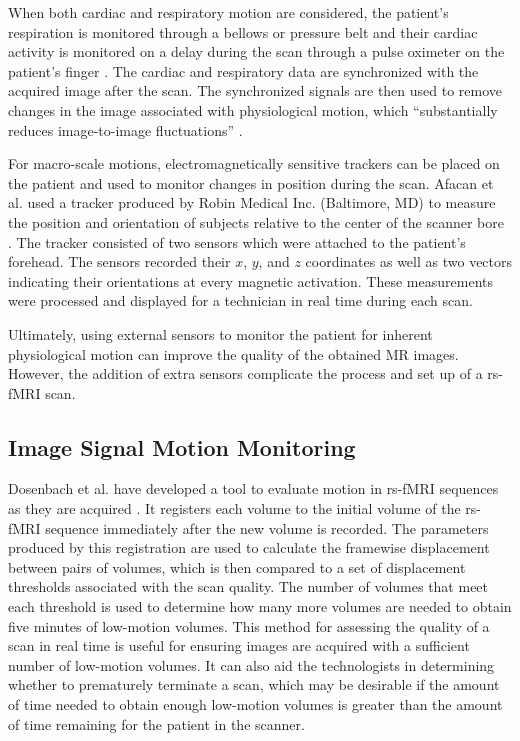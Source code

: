When both cardiac and respiratory motion are considered, the patient's respiration is monitored through a bellows or pressure belt and their cardiac activity is monitored on a delay during the scan through a pulse oximeter on the patient's finger \cite{Hu1995}. The cardiac and respiratory data are synchronized with the acquired image after the scan. The synchronized signals are then used to remove changes in the image associated with physiological motion, which ``substantially reduces image-to-image fluctuations'' \cite{Hu199}.


For macro-scale motions, electromagnetically sensitive trackers can be placed on the patient and used to monitor changes in position during the scan. Afacan et al. used a tracker produced by Robin Medical Inc. (Baltimore, MD) to measure the position and orientation of subjects relative to the center of the scanner bore \cite{Afacan2016}. The tracker consisted of two sensors which were attached to the patient's forehead. The sensors recorded their $x$, $y$, and $z$ coordinates as well as two vectors indicating their orientations at every magnetic activation. These measurements were processed and displayed for a technician in real time during each scan.


Ultimately, using external sensors to monitor the patient for inherent physiological motion can improve the quality of the obtained MR images. However, the addition of extra sensors complicate the process and set up of a rs-fMRI scan.

\subsection{Image Signal Motion Monitoring}



Dosenbach et al. have developed a tool to evaluate motion in rs-fMRI sequences as they are acquired \cite{Dosenbach2017}. It registers each volume to the initial volume of the rs-fMRI sequence immediately after the new volume is recorded. The parameters produced by this registration are used to calculate the framewise displacement between pairs of volumes, which is then compared to a set of displacement thresholds associated with the scan quality. The number of volumes that meet each threshold is used to determine how many more volumes are needed to obtain five minutes of low-motion volumes. This method for assessing the quality of a scan in real time is useful for ensuring images are acquired with a sufficient number of low-motion volumes. It can also aid the technologists in determining whether to prematurely terminate a scan, which may be desirable if the amount of time needed to obtain enough low-motion volumes is greater than the amount of time remaining for the patient in the scanner. 


